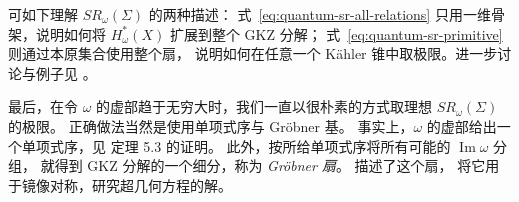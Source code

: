 \begin{example}
可如下理解 $SR_\omega(\Sigma)$ 的两种描述：
式~\eqref{eq:quantum-sr-all-relations} 只用一维骨架，说明如何将 $H_\omega^*(X)$ 扩展到整个 GKZ 分解；
式~\eqref{eq:quantum-sr-primitive} 则通过本原集合使用整个扇，
说明如何在任意一个 Kähler 锥中取极限。进一步讨论与例子见 。

最后，在令 $\omega$ 的虚部趋于无穷大时，我们一直以很朴素的方式取理想 $SR_\omega(\Sigma)$ 的极限。
正确做法当然是使用单项式序与 Gröbner 基。
事实上，$\omega$ 的虚部给出一个单项式序，见  定理 5.3 的证明。
此外，按所给单项式序将所有可能的 $\operatorname{Im}\omega$ 分组，
就得到 GKZ 分解的一个细分，称为 \emph{Gröbner 扇}。
 描述了这个扇， 将它用于镜像对称，研究超几何方程的解。
\end{example}

